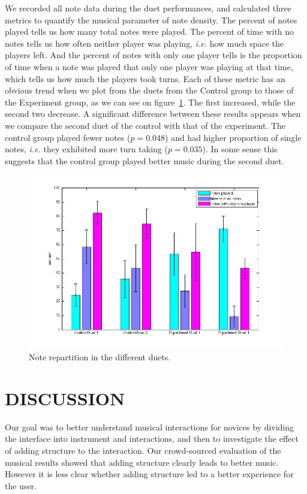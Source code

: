 \documentclass{article}
\begin{document}
We recorded all note data during the duet performances, and calculated three metrics to quantify the musical parameter of note density. The percent of notes played tells us how many total notes were played. The percent of time with no notes tells us how often neither player was playing, \emph{i.e.} how much space the players left. And the percent of notes with only one player tells is the proportion of time when a note was played that only one player was playing at that time, which tells us how much the players took turns. Each of these metric has an obvious trend when we plot from the duets from the Control group to those of the Experiment group, as we can see on figure~\ref{note-stats}. The first increased, while the second two decrease. A significant difference between these results appears when we compare the second duet of the control with that of the experiment. The control group played fewer notes ($p = 0.048$) and had higher proportion of single notes, \emph{i.e.} they exhibited more turn taking ($p = 0.035$). In some sense this suggests that the control group played better music during the second duet. 

\begin{figure}[tb]
\includegraphics[width=\columnwidth]{note_analysis_new.jpg}
\caption{Note repartition in the different duets.} 
\label{note-stats}
\end{figure}




\section{DISCUSSION}

Our goal was to better understand musical interactions for novices by dividing the interface into instrument and interactions, and then to investigate the effect of adding structure to the interaction.  Our crowd-sourced evaluation of the musical results showed that adding structure clearly leads to better music.  However it is less clear whether adding structure led to a better experience for the user.  
\end{document}
